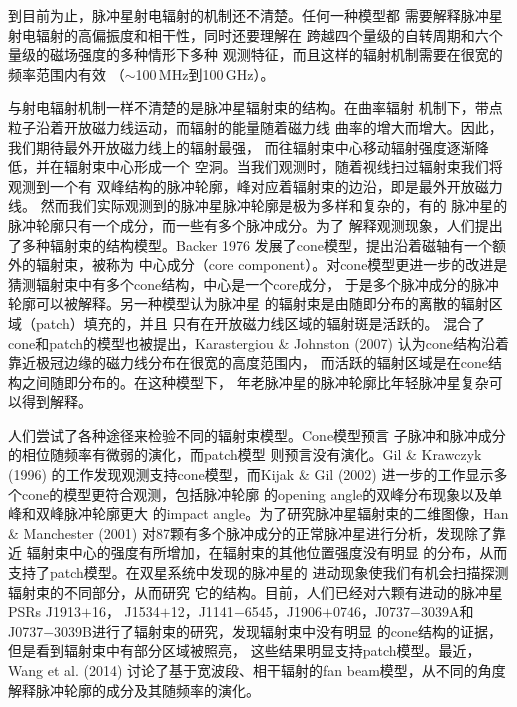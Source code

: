 到目前为止，脉冲星射电辐射的机制还不清楚。任何一种模型都
需要解释脉冲星射电辐射的高偏振度和相干性，同时还要理解在
跨越四个量级的自转周期和六个量级的磁场强度的多种情形下多种
观测特征，而且这样的辐射机制需要在很宽的频率范围内有效
（$\sim$100\,MHz到100\,GHz）。

与射电辐射机制一样不清楚的是脉冲星辐射束的结构。在曲率辐射
机制下，带点粒子沿着开放磁力线运动，而辐射的能量随着磁力线
曲率的增大而增大。因此，我们期待最外开放磁力线上的辐射最强，
而往辐射束中心移动辐射强度逐渐降低，并在辐射束中心形成一个
空洞。当我们观测时，随着视线扫过辐射束我们将观测到一个有
双峰结构的脉冲轮廓，峰对应着辐射束的边沿，即是最外开放磁力线。
然而我们实际观测到的脉冲星脉冲轮廓是极为多样和复杂的，有的
脉冲星的脉冲轮廓只有一个成分，而一些有多个脉冲成分。为了
解释观测现象，人们提出了多种辐射束的结构模型。Backer 1976\supercite{bac76}
发展了cone模型，提出沿着磁轴有一个额外的辐射束，被称为
中心成分（core component）。对cone模型更进一步的改进是
猜测辐射束中有多个cone结构，中心是一个core成分\supercite{os76,os77,Rankin93,gks93}，
于是多个脉冲成分的脉冲轮廓可以被解释。另一种模型认为脉冲星
的辐射束是由随即分布的离散的辐射区域（patch）填充的，并且
只有在开放磁力线区域的辐射斑是活跃的\supercite{Lyne88}。
混合了cone和patch的模型也被提出，Karastergiou \& Johnston (2007)\supercite{Kara07}
认为cone结构沿着靠近极冠边缘的磁力线分布在很宽的高度范围内，
而活跃的辐射区域是在cone结构之间随即分布的。在这种模型下，
年老脉冲星的脉冲轮廓比年轻脉冲星复杂可以得到解释。

人们尝试了各种途径来检验不同的辐射束模型。Cone模型预言
子脉冲和脉冲成分的相位随频率有微弱的演化，而patch模型
则预言没有演化\supercite{gk96,kg02}。Gil \& Krawczyk (1996)\supercite{gk96}
的工作发现观测支持cone模型，而Kijak \& Gil (2002)\supercite{kg02}
进一步的工作显示多个cone的模型更符合观测，包括脉冲轮廓
的opening angle的双峰分布现象以及单峰和双峰脉冲轮廓更大
的impact angle。为了研究脉冲星辐射束的二维图像，Han \& Manchester (2001)\supercite{Han01}
对87颗有多个脉冲成分的正常脉冲星进行分析，发现除了靠近
辐射束中心的强度有所增加，在辐射束的其他位置强度没有明显
的分布，从而支持了patch模型。在双星系统中发现的脉冲星的
进动现象使我们有机会扫描探测辐射束的不同部分，从而研究
它的结构。目前，人们已经对六颗有进动的脉冲星PSRs J1913$+$16，
J1534$+$12，J1141$-$6545，J1906$+$0746，J0737$-$3039A和
J0737$-$3039B进行了辐射束的研究\supercite{kra12}，发现辐射束中没有明显
的cone结构的证据，但是看到辐射束中有部分区域被照亮，
这些结果明显支持patch模型。最近，Wang et al. (2014)\supercite{Wang14}
讨论了基于宽波段、相干辐射的fan beam模型，从不同的角度
解释脉冲轮廓的成分及其随频率的演化。

